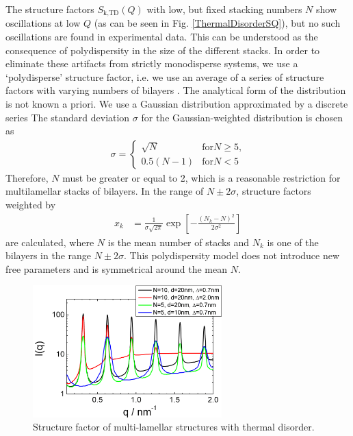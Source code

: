 The structure factors $S_\text{k,TD}(Q)$ with low, but fixed
stacking numbers $N$ show oscillations at low $Q$ (as can be seen in
Fig. \ref{ThermalDisorderSQ}), but no such oscillations are found in
experimental data. This can be understood as the consequence of
polydispersity in the size of the different stacks. In order to
eliminate these artifacts from strictly monodisperse systems, we use
a `polydisperse' structure factor, i.e. we use an average of a
series of structure factors with varying numbers of bilayers
\cite{Fruhwirth2004}. The analytical form of the distribution is not
known a priori. We use a Gaussian distribution approximated by a
discrete series The standard deviation $\sigma$ for the
Gaussian-weighted distribution is chosen as
\begin{align}
\sigma =
\begin{cases}
\sqrt{N} & \text{for} N\geq 5 \text{,} \\
0.5(N-1) & \text{for} N< 5
\end{cases}
\end{align}
Therefore, $N$ must be greater or equal to 2, which is a
reasonable restriction for multilamellar stacks of bilayers. In
the range of $N \pm 2\sigma$, structure factors weighted by
\begin{align}
x_k & = \frac{1}{\sigma\sqrt{2\pi}} \exp\left[
-\frac{(N_k-N)^2}{2\sigma^2}\right]
\end{align}
are calculated, where $N$ is the mean number of stacks and $N_k$
is one of the  bilayers in the range $N\pm 2\sigma$. This
polydispersity model does not introduce new free parameters and is
symmetrical around the mean $N$.

\begin{figure}[htb]
\begin{center}
\includegraphics[width=0.65\textwidth,height=0.5\textwidth]{../images/structure_factor/Lamellar/TDLamellar.png}
\end{center}
\caption{Structure factor of multi-lamellar structures with thermal disorder. }
\label{fig:TDLamellar}
\end{figure}

